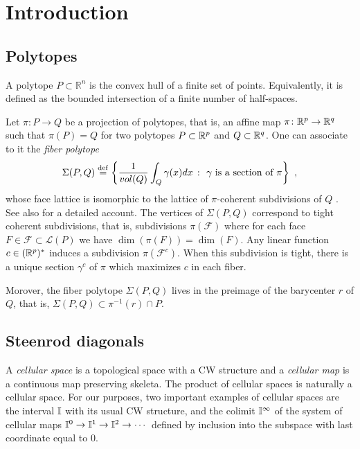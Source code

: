 
\section{Introduction} \label{s:introduction}

\subsection{Polytopes}

A polytope $P \subset \mathbb{R}^n$ is the convex hull of a finite set of points. Equivalently, it is defined as the bounded intersection of a finite number of half-spaces.

Let $\pi \colon P \to Q$ be a projection of polytopes, that is, an affine map $\pi \colon \mathbb{R}^p \to \mathbb{R}^q$ such that $\pi(P)=Q$ for two polytopes $P\subset \mathbb{R}^p$ and $Q \subset \mathbb{R}^q$.
One can associate to it the \emph{fiber polytope} \[\Sigma(P,Q) \stackrel{\mathrm{def}}{=} \left\{ \frac{1}{vol(Q)}\int_Q \gamma(x)dx \ \colon \ \gamma \text{ is a section of }\pi \right\} \ , \] whose face lattice is isomorphic to the lattice of $\pi$-coherent subdivisions of $Q$ \cite{BilleraSturmfels92}.
See also \cite[Chapter 9]{Ziegler95} for a detailed account.
The vertices of $\Sigma(P,Q)$ correspond to tight coherent subdivisions, that is, subdivisions $\pi(\mathcal{F})$ where for each face $F \in \mathcal{F}\subset\mathcal{L}(P)$ we have $\dim(\pi(F))=\dim(F)$.
Any linear function $c\in (\mathbb{R}^p)^{*}$ induces a subdivision $\pi(\mathcal{F}^c)$.
When this subdivision is tight, there is a unique section $\gamma^c$ of $\pi$ which maximizes $c$ in each fiber.

Morover, the fiber polytope $\Sigma(P,Q)$ lives in the preimage of the barycenter $r$ of $Q$, that is, $\Sigma(P,Q)\subset\pi^{-1}(r)\cap P$.

\subsection{Steenrod diagonals}

A \textit{cellular space} is a topological space with a CW structure and a \textit{cellular map} is a continuous map preserving skeleta.
The product of cellular spaces is naturally a cellular space.
For our purposes, two important examples of cellular spaces are the interval $\mathbb{I}$ with its usual CW structure, and the colimit $\mathbb{I}^\infty$ of the system of cellular maps $\mathbb{I}^0 \to \mathbb{I}^1 \to \mathbb{I}^2 \to \dotsb$ defined by inclusion into the subspace with last coordinate equal to $0$.

